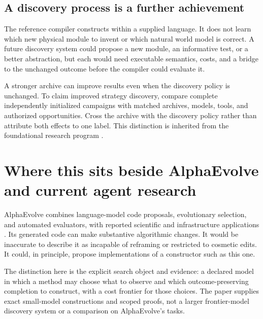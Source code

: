 \documentclass[11pt,letterpaper]{article}
\theoremstyle{remark}\newtheorem{remark}{Remark}[section]
\begin{document}
\subsection{A discovery process is a further achievement}
The reference compiler constructs within a supplied language. It does not learn which new physical module to invent or which natural world model is correct. A future discovery system could propose a new module, an informative test, or a better abstraction, but each would need executable semantics, costs, and a bridge to the unchanged outcome before the compiler could evaluate it.

A stronger archive can improve results even when the discovery policy is unchanged. To claim improved strategy discovery, compare complete independently initialized campaigns with matched archives, models, tools, and authorized opportunities. Cross the archive with the discovery policy rather than attribute both effects to one label. This distinction is inherited from the foundational research program \citep{boucherTI,brief}.

\section{Where this sits beside AlphaEvolve and current agent research}
\label{sec:comparison}
AlphaEvolve combines language-model code proposals, evolutionary selection, and automated evaluators, with reported scientific and infrastructure applications \citep{alphaevolve,alphaImpact}. Its generated code can make substantive algorithmic changes. It would be inaccurate to describe it as incapable of reframing or restricted to cosmetic edits. It could, in principle, propose implementations of a constructor such as this one.

The distinction here is the explicit search object and evidence: a declared model in which a method may choose what to observe and which outcome-preserving completion to construct, with a cost frontier for those choices. The paper supplies exact small-model constructions and scoped proofs, not a larger frontier-model discovery system or a comparison on AlphaEvolve's tasks.
\end{document}
